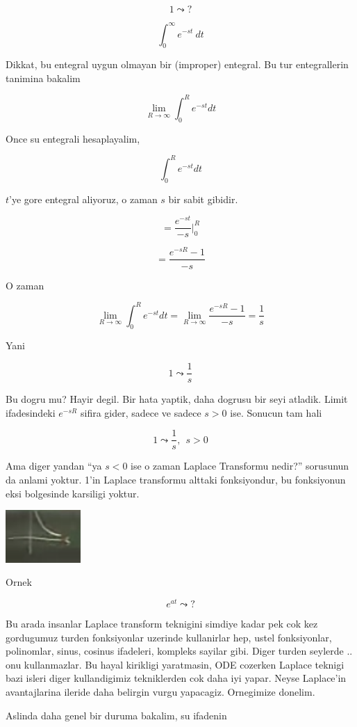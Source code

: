 \documentclass[12pt,fleqn]{article}
\begin{document}
\[ 1 \leadsto ? \]

\[ \int_0^{\infty} e^{-st} \ dt \]

Dikkat, bu entegral uygun olmayan bir (improper) entegral. Bu tur
entegrallerin tanimina bakalim

\[ \lim_{R \to \infty}  \int_{0}^{R} e^{-st} dt  \]

Once su entegrali hesaplayalim, 

\[  \int_{0}^{R} e^{-st} dt \]

$t$'ye gore entegral aliyoruz, o zaman $s$ bir sabit gibidir. 

\[  = \frac{ e^{-st}}{-s}  \bigg|_{0}^{R} \]

\[ = \frac{e^{-sR} - 1}{-s} \]

O zaman 

\[ \lim_{R \to \infty}  \int_{0}^{R} e^{-st} dt  = 
\lim_{R \to \infty} \frac{e^{-sR} - 1}{-s}  = 
\frac{1}{s}
\]

Yani 

\[ 1 \leadsto \frac{1}{s} \]

Bu dogru mu? Hayir degil. Bir hata yaptik, daha dogrusu bir seyi
atladik. Limit ifadesindeki $e^{-sR}$ sifira gider, sadece ve sadece $s >
0$ ise. 
Sonucun tam hali 

\[ 1 \leadsto \frac{1}{s}, \ \ s > 0 \]

Ama diger yandan ``ya $s < 0$ ise o zaman Laplace Transformu nedir?''
sorusunun da anlami yoktur. 1'in Laplace transformu alttaki fonksiyondur,
bu fonksiyonun eksi bolgesinde karsiligi yoktur. 

\includegraphics[height=2cm]{19_2.png}

Ornek 

\[ e^{at} \leadsto ? \]

Bu arada insanlar Laplace transform teknigini simdiye kadar pek cok kez
gordugumuz turden fonksiyonlar uzerinde kullanirlar hep, ustel fonksiyonlar,
polinomlar, sinus, cosinus ifadeleri, kompleks sayilar gibi. Diger turden
seylerde .. onu kullanmazlar. Bu hayal kirikligi yaratmasin, ODE cozerken
Laplace teknigi bazi isleri diger kullandigimiz tekniklerden cok daha iyi
yapar. Neyse Laplace'in avantajlarina ileride daha belirgin vurgu
yapacagiz. Ornegimize donelim. 

Aslinda daha genel bir duruma bakalim, su ifadenin
\end{document}
